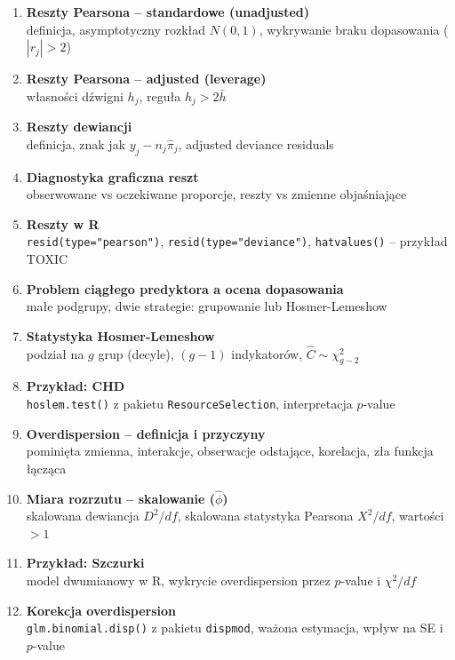 \documentclass[a4paper,11pt]{article}
\begin{document}
\vspace{0.4em}
\begin{enumerate}[label=\textbf{\arabic*.}, leftmargin=1.8em, itemsep=3pt, topsep=2pt]
  \item \textbf{Reszty Pearsona -- standardowe (unadjusted)}\\
        {\small\color{medgray}definicja, asymptotyczny rozkład $N(0,1)$, wykrywanie braku dopasowania ($|r_j|>2$)}
  \item \textbf{Reszty Pearsona -- adjusted (leverage)}\\
        {\small\color{medgray}własności dźwigni $h_j$, reguła $h_j > 2\bar{h}$}
  \item \textbf{Reszty dewiancji}\\
        {\small\color{medgray}definicja, znak jak $y_j - n_j\hat\pi_j$, adjusted deviance residuals}
  \item \textbf{Diagnostyka graficzna reszt}\\
        {\small\color{medgray}obserwowane vs oczekiwane proporcje, reszty vs zmienne objaśniające}
  \item \textbf{Reszty w R}\\
        {\small\color{medgray}\texttt{resid(type="pearson")}, \texttt{resid(type="deviance")}, \texttt{hatvalues()} -- przykład TOXIC}
  \item \textbf{Problem ciągłego predyktora a ocena dopasowania}\\
        {\small\color{medgray}małe podgrupy, dwie strategie: grupowanie lub Hosmer-Lemeshow}
  \item \textbf{Statystyka Hosmer-Lemeshow}\\
        {\small\color{medgray}podział na $g$ grup (decyle), $(g-1)$ indykatorów, $\hat{C} \sim \chi^2_{g-2}$}
  \item \textbf{Przykład: CHD}\\
        {\small\color{medgray}\texttt{hoslem.test()} z pakietu \texttt{ResourceSelection}, interpretacja $p$-value}
  \item \textbf{Overdispersion -- definicja i przyczyny}\\
        {\small\color{medgray}pominięta zmienna, interakcje, obserwacje odstające, korelacja, zła funkcja łącząca}
  \item \textbf{Miara rozrzutu -- skalowanie ($\hat\phi$)}\\
        {\small\color{medgray}skalowana dewiancja $D^2/df$, skalowana statystyka Pearsona $X^2/df$, wartości $>1$}
  \item \textbf{Przykład: Szczurki}\\
        {\small\color{medgray}model dwumianowy w R, wykrycie overdispersion przez $p$-value i $\chi^2/df$}
  \item \textbf{Korekcja overdispersion}\\
        {\small\color{medgray}\texttt{glm.binomial.disp()} z pakietu \texttt{dispmod}, ważona estymacja, wpływ na SE i $p$-value}
\end{enumerate}
\end{document}
